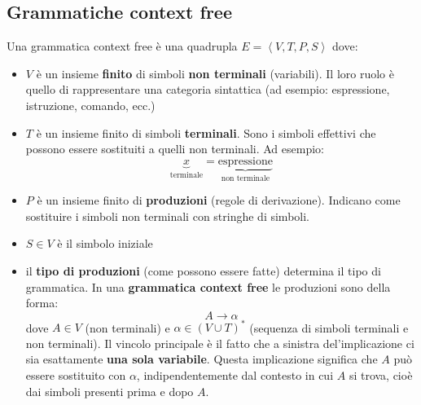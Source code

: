 \documentclass[a4paper]{article}
\begin{document}
\subsection{Grammatiche context free}
Una grammatica context free è una quadrupla \( E = \left< V, T, P, S \right> \) dove:
\begin{itemize}
  \item \( V \) è un insieme \textbf{finito} di simboli \textbf{non terminali} (variabili).
    Il loro ruolo è quello di rappresentare una categoria sintattica (ad esempio: espressione,
    istruzione, comando, ecc.)

  \item \( T \) è un insieme finito di simboli \textbf{terminali}. Sono i simboli effettivi
    che possono essere sostituiti a quelli non terminali. Ad esempio:
    \[
      \underbrace{x}_{\text{terminale}} = \underbrace{\text{espressione}}_{\text{non terminale}}
    \] 

  \item \( P \) è un insieme finito di \textbf{produzioni} (regole di derivazione).
    Indicano come sostituire i simboli non terminali con stringhe di simboli.

  \item \( S \in V \) è il simbolo iniziale

  \item il \textbf{tipo di produzioni} (come possono essere fatte) determina il tipo
    di grammatica. In una \textbf{grammatica context free} le produzioni sono della forma:
    \[
      A \to \alpha
    \] 
    dove \( A \in V \) (non terminali) e \( \alpha \in \left( V \cup T \right)^* \)
    (sequenza di simboli terminali e non terminali). Il vincolo principale è il fatto
    che a sinistra del'implicazione ci sia esattamente \textbf{una sola variabile}.
    Questa implicazione significa che \( A \) può essere sostituito con \( \alpha \),
    indipendentemente dal contesto in cui \( A \) si trova,
    cioè dai simboli presenti prima e dopo \( A \).
\end{itemize}
\end{document}
